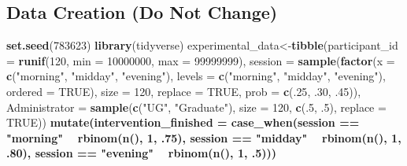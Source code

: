 \documentclass[]{book}
\newenvironment{Shaded}{\begin{snugshade}}{\end{snugshade}}
\newcommand{\DataTypeTok}[1]{\textcolor[rgb]{0.13,0.29,0.53}{#1}}
\newcommand{\DecValTok}[1]{\textcolor[rgb]{0.00,0.00,0.81}{#1}}
\newcommand{\FloatTok}[1]{\textcolor[rgb]{0.00,0.00,0.81}{#1}}
\newcommand{\KeywordTok}[1]{\textcolor[rgb]{0.13,0.29,0.53}{\textbf{#1}}}
\newcommand{\NormalTok}[1]{#1}
\newcommand{\OperatorTok}[1]{\textcolor[rgb]{0.81,0.36,0.00}{\textbf{#1}}}
\newcommand{\OtherTok}[1]{\textcolor[rgb]{0.56,0.35,0.01}{#1}}
\newcommand{\StringTok}[1]{\textcolor[rgb]{0.31,0.60,0.02}{#1}}
\theoremstyle{definition}
\theoremstyle{definition}
\theoremstyle{definition}
\theoremstyle{remark}
\begin{document}
\hypertarget{data-creation-do-not-change}{%
\subsection{Data Creation (Do Not Change)}\label{data-creation-do-not-change}}

\begin{Shaded}
\begin{Highlighting}[]
\KeywordTok{set.seed}\NormalTok{(}\DecValTok{783623}\NormalTok{)}
\KeywordTok{library}\NormalTok{(tidyverse)}
\NormalTok{experimental_data<-}\KeywordTok{tibble}\NormalTok{(}\DataTypeTok{participant_id =} \KeywordTok{runif}\NormalTok{(}\DecValTok{120}\NormalTok{, }\DataTypeTok{min =} \DecValTok{10000000}\NormalTok{, }\DataTypeTok{max =} \DecValTok{99999999}\NormalTok{),}
  \DataTypeTok{session =} \KeywordTok{sample}\NormalTok{(}\KeywordTok{factor}\NormalTok{(}\DataTypeTok{x =} \KeywordTok{c}\NormalTok{(}\StringTok{"morning"}\NormalTok{, }\StringTok{"midday"}\NormalTok{, }\StringTok{"evening"}\NormalTok{), }\DataTypeTok{levels =} \KeywordTok{c}\NormalTok{(}\StringTok{"morning"}\NormalTok{, }\StringTok{"midday"}\NormalTok{, }\StringTok{"evening"}\NormalTok{), }\DataTypeTok{ordered =} \OtherTok{TRUE}\NormalTok{), }\DataTypeTok{size =} \DecValTok{120}\NormalTok{, }\DataTypeTok{replace =} \OtherTok{TRUE}\NormalTok{, }\DataTypeTok{prob =} \KeywordTok{c}\NormalTok{(.}\DecValTok{25}\NormalTok{, }\FloatTok{.30}\NormalTok{, }\FloatTok{.45}\NormalTok{)),}
          \DataTypeTok{Administrator =} \KeywordTok{sample}\NormalTok{(}\KeywordTok{c}\NormalTok{(}\StringTok{"UG"}\NormalTok{, }\StringTok{"Graduate"}\NormalTok{), }\DataTypeTok{size =} \DecValTok{120}\NormalTok{, }\KeywordTok{c}\NormalTok{(.}\DecValTok{5}\NormalTok{, }\FloatTok{.5}\NormalTok{), }\DataTypeTok{replace =} \OtherTok{TRUE}\NormalTok{))}\OperatorTok{%
\StringTok{  }\KeywordTok{mutate}\NormalTok{(}\DataTypeTok{intervention_finished =} \KeywordTok{case_when}\NormalTok{(session }\OperatorTok{==}\StringTok{ "morning"} \OperatorTok{~}\StringTok{ }\KeywordTok{rbinom}\NormalTok{(}\KeywordTok{n}\NormalTok{(), }\DecValTok{1}\NormalTok{, }\FloatTok{.75}\NormalTok{),}
\NormalTok{                               session }\OperatorTok{==}\StringTok{ "midday"} \OperatorTok{~}\StringTok{ }\KeywordTok{rbinom}\NormalTok{(}\KeywordTok{n}\NormalTok{(), }\DecValTok{1}\NormalTok{, }\FloatTok{.80}\NormalTok{), }
\NormalTok{                               session }\OperatorTok{==}\StringTok{ "evening"} \OperatorTok{~}\StringTok{ }\KeywordTok{rbinom}\NormalTok{(}\KeywordTok{n}\NormalTok{(), }\DecValTok{1}\NormalTok{, }\FloatTok{.5}\NormalTok{)))}\OperatorTok{%
}}
\end{Highlighting}
\end{Shaded}
\end{document}

